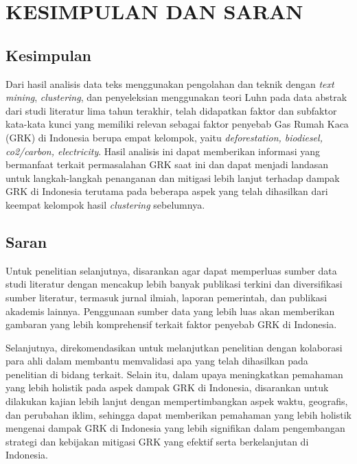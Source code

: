 \chapter{KESIMPULAN DAN SARAN}
\label{BAB5:kesimpulan}

\section{Kesimpulan}
Dari hasil analisis data teks menggunakan pengolahan dan teknik dengan \textit{text mining}, \textit{clustering}, dan penyeleksian menggunakan teori Luhn pada data abstrak dari studi literatur lima tahun terakhir, telah didapatkan faktor dan subfaktor kata-kata kunci yang memiliki relevan sebagai faktor penyebab Gas Rumah Kaca (GRK) di Indonesia berupa empat kelompok, yaitu \textit{deforestation, biodiesel, co2/carbon, electricity}. Hasil analisis ini dapat memberikan informasi yang bermanfaat terkait permasalahan GRK saat ini dan dapat menjadi landasan untuk langkah-langkah penanganan dan mitigasi lebih lanjut terhadap dampak GRK di Indonesia terutama pada beberapa aspek yang telah dihasilkan dari keempat kelompok hasil \textit{clustering} sebelumnya.

\section{Saran}
Untuk penelitian selanjutnya, disarankan agar dapat memperluas sumber data studi literatur dengan mencakup lebih banyak publikasi terkini dan diversifikasi sumber literatur, termasuk jurnal ilmiah, laporan pemerintah, dan publikasi akademis lainnya. Penggunaan sumber data yang lebih luas akan memberikan gambaran yang lebih komprehensif terkait faktor penyebab GRK di Indonesia.

Selanjutnya, direkomendasikan untuk melanjutkan penelitian dengan kolaborasi para ahli dalam membantu memvalidasi apa yang telah dihasilkan pada penelitian di bidang terkait. Selain itu, dalam upaya meningkatkan pemahaman yang lebih holistik pada aspek dampak GRK di Indonesia, disarankan untuk dilakukan kajian lebih lanjut dengan mempertimbangkan aspek waktu, geografis, dan perubahan iklim, sehingga dapat memberikan pemahaman yang lebih holistik mengenai dampak GRK di Indonesia yang lebih signifikan dalam pengembangan strategi dan kebijakan mitigasi GRK yang efektif serta berkelanjutan di Indonesia. 